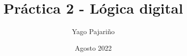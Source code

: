 
\setlength{\parindent}{0pt}

\title{Práctica 2 - Lógica digital}
\author{Yago Pajariño}
\date{Agosto 2022}



\maketitle




